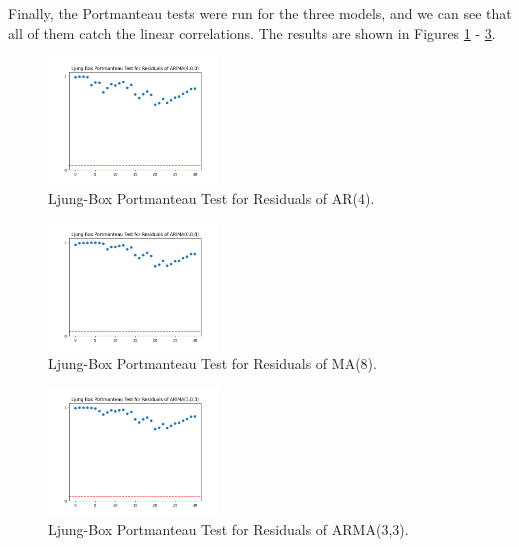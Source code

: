 \documentclass[conference]{IEEEtran}
\begin{document}
Finally, the Portmanteau tests were run for the three models, and we can see that all of them catch the linear correlations. The results are shown in Figures \ref{p4} - \ref{p33g}.
\vspace{80mm}

\begin{figure}[ht]
    \centering
    \includegraphics[width=0.40\textwidth]{Figures/GlasnevinLin/Ljung-Box Portmanteau Test for Residuals of ARIMA(4,0,0).png}
    \caption{Ljung-Box Portmanteau Test for Residuals of AR(4).}
    \label{p4}
\end{figure}

\begin{figure}[ht]
    \centering
    \includegraphics[width=0.40\textwidth]{Figures/GlasnevinLin/Ljung-Box Portmanteau Test for Residuals of ARIMA(0,0,8).png}
    \caption{Ljung-Box Portmanteau Test for Residuals of MA(8).}
    \label{p8}
\end{figure}

\begin{figure}[ht]
    \centering
    \includegraphics[width=0.40\textwidth]{Figures/GlasnevinLin/Ljung-Box Portmanteau Test for Residuals of ARIMA(3,0,3).png}
    \caption{Ljung-Box Portmanteau Test for Residuals of ARMA(3,3).}
    \label{p33g}
\end{figure}
\end{document}

